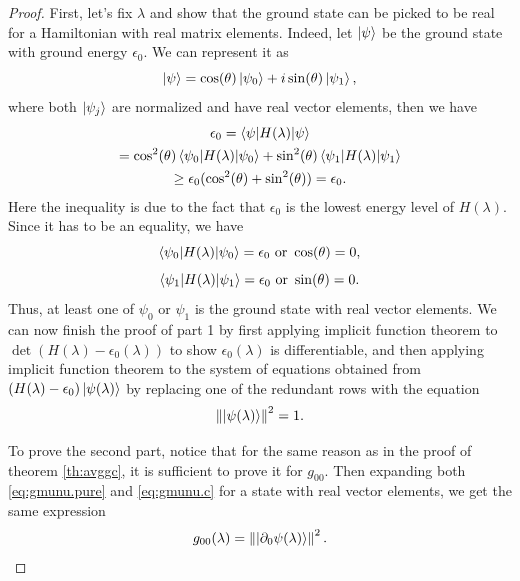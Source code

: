 \documentclass[
  american,aps,pra,reprint,floatfix,nofootinbib,superscriptaddress
]{revtex4-2}
\newcommand{\norm}[1]{\left\|#1\right\|}
\begin{document}
\begin{proof}
  First, let's fix $\lambda$ and show that the ground state can be picked
  to be real for a Hamiltonian with real matrix elements.
  Indeed, let $\ket{\psi}$ be the ground
  state with ground energy $\epsilon_0$. We can represent it as
  \begin{equation}
    \ket{\psi} = \cos(\theta) \ket{\psi_0} + i\sin(\theta) \ket{\psi_1},
  \end{equation}
  where both $\ket{\psi_j}$ are normalized and have
  real vector elements, then we have
  \begin{multline}
    \epsilon_0 = \braket{\psi|H(\lambda)|\psi} \\
    = \cos^2(\theta) \braket{\psi_0|H(\lambda)|\psi_0}
      + \sin^2(\theta) \braket{\psi_1|H(\lambda)|\psi_1} \\
    \geq \epsilon_0 (\cos^2(\theta) + \sin^2(\theta))
    = \epsilon_0.
  \end{multline}
  Here the inequality is due to the fact that $\epsilon_0$ is the
  lowest energy level of $H(\lambda)$. Since it has to be an equality,
  we have
  \begin{equation}
    \braket{\psi_0|H(\lambda)|\psi_0} = \epsilon_0
      \textrm{ or } \cos(\theta) = 0,
  \end{equation}
  \begin{equation}
    \braket{\psi_1|H(\lambda)|\psi_1} = \epsilon_0
      \textrm{ or } \sin(\theta) = 0.
  \end{equation}
  Thus, at least one of $\psi_0$ or $\psi_1$ is the ground state
  with real vector elements.
  We can now finish the proof of part 1 by first applying implicit function
  theorem to $\det(H(\lambda) - \epsilon_0(\lambda))$ to show
  $\epsilon_0(\lambda)$ is differentiable, and then
  applying implicit function theorem to the system of equations obtained
  from $(H(\lambda) - \epsilon_0) \ket{\psi(\lambda)}$ by replacing
  one of the redundant rows with the equation
  \begin{equation}
    \norm{\ket{\psi(\lambda)}}^2 = 1.
  \end{equation}

  To prove the second part, notice that for the same reason as in the proof
  of theorem \ref{th:avggc}, it is sufficient to prove it for $g_{00}$.
  Then expanding both \eqref{eq:gmunu.pure} and \eqref{eq:gmunu.c} for
  a state with real vector elements, we get the same expression
  \begin{equation}
    g_{00}(\lambda) = \norm{\ket{\partial_0\psi(\lambda)}}^2.
  \end{equation}
\end{proof}
\end{document}
